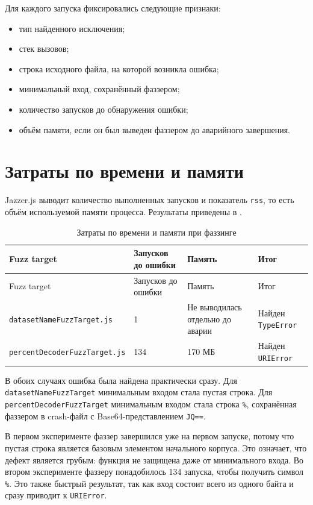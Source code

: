 Для каждого запуска фиксировались следующие признаки:
\begin{itemize}
    \item тип найденного исключения;
    \item стек вызовов;
    \item строка исходного файла, на которой возникла ошибка;
    \item минимальный вход, сохранённый фаззером;
    \item количество запусков до обнаружения ошибки;
    \item объём памяти, если он был выведен фаззером до аварийного завершения.
\end{itemize}

\section{Затраты по времени и памяти} \label{ch2:sec2}

Jazzer.js выводит количество выполненных запусков и показатель \texttt{rss}, то есть
объём используемой памяти процесса. Результаты приведены в .

\noindent
\begingroup
\centering
\small
\begin{longtable}[c]{|p{4.2cm}|p{3cm}|p{3cm}|p{4.5cm}|}
    \caption{Затраты по времени и памяти при фаззинге}
    \label{tab:fuzz-costs}
    \\
    \hline
    Fuzz target & Запусков до ошибки & Память & Итог \\ \hline
    \endfirsthead
    \hline
    Fuzz target & Запусков до ошибки & Память & Итог \\ \hline
    \endhead
    \hline
    \texttt{datasetNameFuzzTarget.js} & 1 & Не выводилась отдельно до аварии & Найден \texttt{TypeError} \\ \hline
    \texttt{percentDecoderFuzzTarget.js} & 134 & 170 МБ & Найден \texttt{URIError} \\ \hline
\end{longtable}
\normalsize
\endgroup

В обоих случаях ошибка была найдена практически сразу. Для \texttt{datasetNameFuzzTarget}
минимальным входом стала пустая строка. Для \texttt{percentDecoderFuzzTarget}
минимальным входом стала строка \texttt{\%}, сохранённая фаззером в crash-файл с
Base64-представлением \texttt{JQ==}.

В первом эксперименте фаззер завершился уже на первом запуске, потому что пустая
строка является базовым элементом начального корпуса. Это означает, что дефект
является грубым: функция не защищена даже от минимального входа. Во втором
эксперименте фаззеру понадобилось 134 запуска, чтобы получить символ
\texttt{\%}. Это также быстрый результат, так как вход состоит всего из одного
байта и сразу приводит к \texttt{URIError}.

